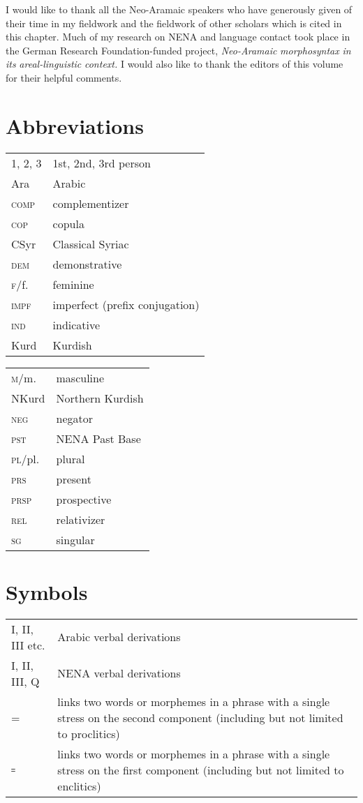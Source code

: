 \documentclass[output=paper]{langsci/langscibook}
\begin{document}
I would like to thank all the Neo-Aramaic speakers who have generously given of their time in my fieldwork and the fieldwork of other scholars which is cited in this chapter. Much of my research on NENA and language contact took place in the German Research Foundation-funded project, \textit{Neo-Aramaic} \textit{morphosyntax} \textit{in} \textit{its} \textit{areal-linguistic} \textit{context.} I would also like to thank the editors of this volume for their helpful comments.

\section*{Abbreviations}

\begin{tabularx}{.5\textwidth}{@{}lQ@{}}
\textsc{1, 2, 3} & 1st, 2nd, 3rd person \\
Ara            & Arabic\\
\textsc{comp}    & complementizer\\
\textsc{cop}     & copula\\
CSyr           & Classical Syriac\\
\textsc{dem}     & demonstrative \\
\textsc{f}/f.    & feminine\\
\textsc{impf}   & imperfect (prefix conjugation)\\
\textsc{ind}     & indicative\\
Kurd           & Kurdish\\
\end{tabularx}%
\begin{tabularx}{.5\textwidth}{@{}lQ@{}}
\textsc{m}/m.    & masculine\\
NKurd        & Northern Kurdish \\ 
\textsc{neg}    & negator\\
\textsc{pst}   & NENA Past Base\\
\textsc{pl}/pl.  & plural\\
\textsc{prs}    & present \\
\textsc{prsp}    & prospective \\
\textsc{rel}     & relativizer\\
\textsc{sg}  & singular
\end{tabularx}%

\section*{Symbols}

\begin{tabularx}{1\textwidth}{@{}lQ@{}}
I, II, III etc. & Arabic verbal derivations\\
I, II, III, Q & NENA verbal derivations\\
= & links two words or morphemes in a phrase with a single stress on the second component (including but not limited to proclitics)\\
꞊ & links two words or morphemes in a phrase with a single stress on the first component (including but not limited to enclitics)
\end{tabularx}%

{\sloppy\printbibliography[heading=subbibliography,notkeyword=this]}
\end{document}
